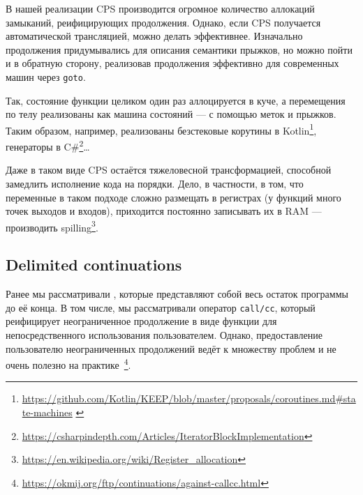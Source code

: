В нашей реализации CPS производится огромное количество аллокаций замыканий, реифицирующих продолжения.
Однако, если CPS получается автоматической трансляцией, можно делать эффективнее.
Изначально продолжения придумывались для описания семантики прыжков, но можно пойти и в обратную сторону, реализовав продолжения эффективно для современных машин через \texttt{goto}.

Так, состояние функции целиком один раз аллоцируется в куче, а перемещения по телу реализованы как машина состояний --- с помощью меток и прыжков.
Таким образом, например, реализованы безстековые корутины в Kotlin\footnote{\url{https://github.com/Kotlin/KEEP/blob/master/proposals/coroutines.md\#state-machines} \label{note:kotlin-state}}, генераторы в C\#\footnote{\url{https://csharpindepth.com/Articles/IteratorBlockImplementation}}\ldots

Даже в таком виде CPS остаётся тяжеловесной трансформацией, способной замедлить исполнение кода на порядки.
Дело, в частности, в том, что переменные в таком подходе сложно размещать в регистрах (у функций много точек выходов и входов), приходится постоянно записывать их в RAM --- производить spilling\footnote{\url{https://en.wikipedia.org/wiki/Register_allocation}}.



%
%
%







\subsection{Delimited continuations}

Ранее мы рассматривали , которые представляют собой весь остаток программы до её конца.
В том числе, мы рассматривали оператор \texttt{call/cc}, который реифицирует неограниченное продолжение в виде функции для непосредственного использования пользователем.
Однако, предоставление пользователю неограниченных продолжений ведёт к множеству проблем и не очень полезно на практике~\footnote{\url{https://okmij.org/ftp/continuations/against-callcc.html}}.

